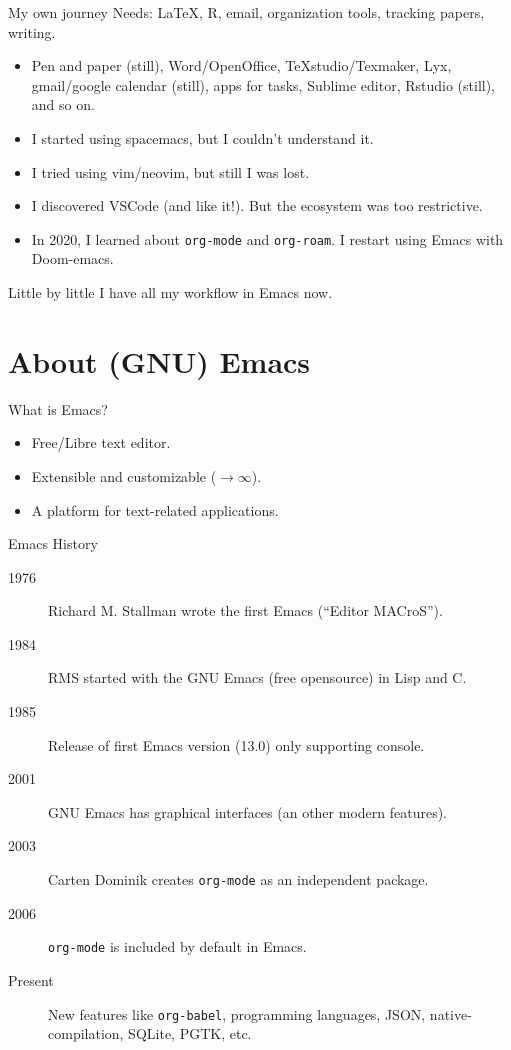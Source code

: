 \documentclass[presentation]{beamer}
\begin{document}
\begin{frame}[label={sec:org48afd10},fragile]{My own journey}
 \alert{\alert{Needs:}} \LaTeX{}, R, email, organization tools, tracking papers, writing.


\begin{itemize}
\item\relax [2002-2015] Pen and paper (still), Word/OpenOffice, TeXstudio/Texmaker, Lyx, gmail/google calendar (still), apps for tasks, Sublime editor, Rstudio (still), and so on.
\item\relax [2016-2017] I started using spacemacs, but I couldn't understand it.
\item\relax [2017] I tried using vim/neovim, but still I was lost.
\item\relax [2018-2020] I discovered VSCode (and like it!). But the ecosystem was too restrictive.
\item\relax [2020-\(\infty\)] In 2020, I learned about \texttt{org-mode} and \texttt{org-roam}.  I restart using Emacs with Doom-emacs.
\end{itemize}

Little by little I have all my workflow in Emacs now.
\end{frame}


\section{About (GNU) Emacs}
\label{sec:org07f6d9f}

\begin{frame}[label={sec:org6bf3dba}]{What is Emacs?}
\begin{itemize}
\item Free/Libre text editor.
\item Extensible and customizable (\(\to\infty\)).
\item A platform for text-related applications.
\end{itemize}
\end{frame}

\begin{frame}[label={sec:org2f0bdd6},fragile]{Emacs History}
 \begin{description}
\item[{1976}] Richard M. Stallman wrote the first Emacs (“Editor MACroS”).
\item[{1984}] RMS started with the GNU Emacs (free opensource) in Lisp and C.
\item[{1985}] Release of first Emacs version (13.0) only supporting console.
\item[{2001}] GNU Emacs has graphical interfaces (an other modern features).
\item[{2003}] Carten Dominik creates \texttt{org-mode} as an independent package.
\item[{2006}] \texttt{org-mode} is included by default in Emacs.
\item[{Present}] New features like \texttt{org-babel}, programming languages, JSON, native-compilation, SQLite, PGTK, etc.
\end{description}
\end{frame}
\end{document}
